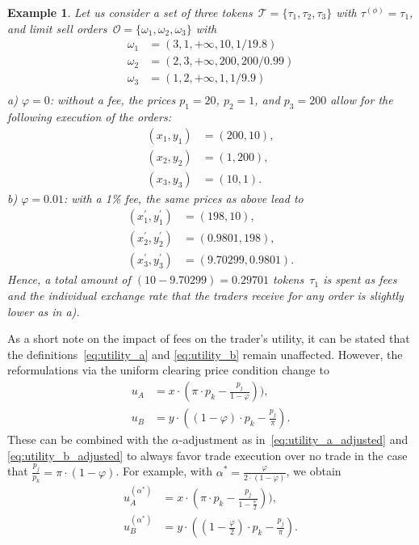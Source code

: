\documentclass[11pt,parskip=full]{scrartcl}%
\newtheorem{example}[theorem]{Example}
\begin{document}
\begin{example}
  Let us consider a set of three tokens~$\mathcal{T} = \{\tau_1,\tau_2,\tau_3\}$ with $\tau^{(\phi)} = \tau_1$, and limit sell orders~$\mathcal{O} = \{\omega_1,\omega_2,\omega_3\}$ with
  \begin{align*}
    \omega_1 &= (3,1,+\infty,10,1/19.8) \\
    \omega_2 &= (2,3,+\infty,200,200/0.99) \\
    \omega_3 &= (1,2,+\infty,1,1/9.9) \\
  \end{align*}
  a) $\varphi = 0$: without a fee, the prices $p_1 = 20$, $p_2 = 1$, and $p_3 = 200$ allow for the following execution of the orders:
  \begin{align*}
    (x_1,y_1) &= (200,10), \\
    (x_2,y_2) &= (1,200), \\
    (x_3,y_3) &= (10,1).
  \end{align*}
  b) $\varphi = 0.01$: with a 1\% fee, the same prices as above lead to
  \begin{align*}
    (x_1^{'},y_1^{'}) &= (198,10), \\
    (x_2^{'},y_2^{'}) &= (0.9801,198), \\
    (x_3^{'},y_3^{'}) &= (9.70299,0.9801).
  \end{align*}
  Hence, a total amount of $(10-9.70299) = 0.29701$ tokens~$\tau_1$ is spent as fees and the individual exchange rate that the traders receive for any order is slightly lower as in a).
\end{example}

As a short note on the impact of fees on the trader's utility, it can be stated that the definitions~\eqref{eq:utility_a} and \eqref{eq:utility_b} remain unaffected.
However, the reformulations via the uniform clearing price condition change to
\begin{subequations}
\begin{align*}
  u_A &= x \cdot (\pi \cdot p_k - \frac{p_j}{1-\varphi})), \\[2mm]
  u_B &= y \cdot ((1-\varphi) \cdot p_k - \frac{p_j}{\pi}).
\end{align*}
\end{subequations}
These can be combined with the $\alpha$-adjustment as in~\eqref{eq:utility_a_adjusted} and \eqref{eq:utility_b_adjusted} to always favor trade execution over no trade in the case that $\frac{p_j}{p_k} = \pi \cdot (1-\varphi)$.
For example, with $\alpha^* = \frac{\varphi}{2 \cdot (1-\varphi)}$, we obtain
\begin{subequations}
\begin{align*}
  u_A^{(\alpha^*)} &= x \cdot (\pi \cdot p_k - \frac{p_j}{1-\frac{\varphi}{2}})), \\[2mm]
  u_B^{(\alpha^*)} &= y \cdot ((1-\frac{\varphi}{2}) \cdot p_k - \frac{p_j}{\pi}).
\end{align*}
\end{subequations}
\end{document}

